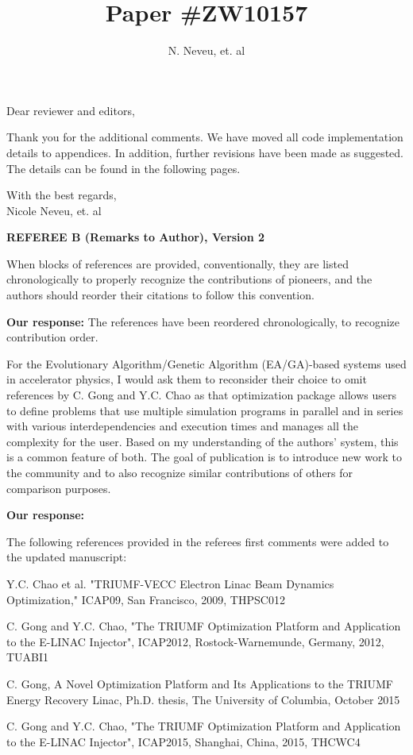 \documentclass{article}
\begin{document}
\title {Paper  \#ZW10157}
\author {N. Neveu, et. al}

\maketitle
Dear reviewer and editors,

Thank you for the additional comments.
We have moved all code implementation details to appendices.
In addition, further revisions have been made as suggested.
The details can be found in the following pages.

With the best regards,  \\[3mm]
 
Nicole Neveu, et. al

\pagebreak

{\bf REFEREE B (Remarks to Author), Version 2}

When blocks of references are provided, conventionally, they are
listed chronologically to properly recognize the contributions of
pioneers, and the authors should reorder their citations to follow
this convention. 

{\bf Our response:} {\color{blue} The references have been 
	reordered chronologically, to recognize contribution order.}

For the Evolutionary Algorithm/Genetic Algorithm
(EA/GA)-based systems used in accelerator physics, I would ask them to
reconsider their choice to omit references by C. Gong and Y.C. Chao as
that optimization package allows users to define problems that use
multiple simulation programs in parallel and in series with various
interdependencies and execution times and manages all the complexity
for the user. Based on my understanding of the authors' system, this
is a common feature of both. The goal of publication is to introduce
new work to the community and to also recognize similar contributions
of others for comparison purposes.

{\bf Our response:} {\color{blue} The following references provided in the 
	referees first comments were added to the updated manuscript: 

Y.C. Chao et al. "TRIUMF-VECC Electron Linac Beam Dynamics
Optimization," ICAP09, San Francisco, 2009, THPSC012

C. Gong and Y.C. Chao, "The TRIUMF Optimization Platform and
Application to the E-LINAC Injector", ICAP2012, Rostock-Warnemunde,
Germany, 2012, TUABI1

C. Gong, A Novel Optimization Platform and Its Applications to the
TRIUMF Energy Recovery Linac, Ph.D. thesis, The University of
Columbia, October 2015

C. Gong and Y.C. Chao, "The TRIUMF Optimization Platform and
Application to the E-LINAC Injector", ICAP2015, Shanghai, China, 2015,
THCWC4}
\end{document}
